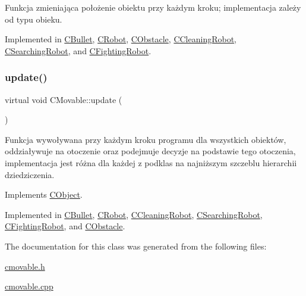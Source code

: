 Funkcja zmieniająca położenie obiektu przy każdym kroku; implementacja zależy od typu obieku. 



Implemented in \mbox{\hyperlink{class_c_bullet_a693e95f219a9a642e3977bb48be0cf5d}{C\+Bullet}}, \mbox{\hyperlink{class_c_robot_a1de9be879213eadf7ded27caedb84598}{C\+Robot}}, \mbox{\hyperlink{class_c_obstacle_a4b2e4989c993dd7f79cd66fd485c3c88}{C\+Obstacle}}, \mbox{\hyperlink{class_c_cleaning_robot_a1ad227a5f3508a8e78fcecae7d3de53b}{C\+Cleaning\+Robot}}, \mbox{\hyperlink{class_c_searching_robot_a2c2150e7fd1cefbb5851e039cd76572f}{C\+Searching\+Robot}}, and \mbox{\hyperlink{class_c_fighting_robot_af644acbba178e256566e9dbd230aa4db}{C\+Fighting\+Robot}}.

\mbox{\label{class_c_movable_af45fc62960d86ef62949d078141e9d62}} 
\subsubsection{\texorpdfstring{update()}{update()}}
{\footnotesize\ttfamily virtual void C\+Movable\+::update (\begin{DoxyParamCaption}{ }\end{DoxyParamCaption})\hspace{0.3cm}{\ttfamily [pure virtual]}}



Funkcja wywoływana przy każdym kroku programu dla wszystkich obiektów, oddziaływuje na otoczenie oraz podejmuje decyzje na podstawie tego otoczenia, implementacja jest różna dla każdej z podklas na najniższym szczeblu hierarchii dziedziczenia. 



Implements \mbox{\hyperlink{class_c_object_acb42ca516e836d0267ddb9a0556916a9}{C\+Object}}.



Implemented in \mbox{\hyperlink{class_c_bullet_a9685917f7fc76d417e03744223b1b2c6}{C\+Bullet}}, \mbox{\hyperlink{class_c_robot_a8ad8d55a840ced20f85a2a045e9e24ef}{C\+Robot}}, \mbox{\hyperlink{class_c_cleaning_robot_afd8b3a58abfc91ebdce32af3686c5e9f}{C\+Cleaning\+Robot}}, \mbox{\hyperlink{class_c_searching_robot_a6e9cdc9eccd32a470d8953f1a3cccd46}{C\+Searching\+Robot}}, \mbox{\hyperlink{class_c_fighting_robot_a3ae0ea383f809766e53c81348a07daaa}{C\+Fighting\+Robot}}, and \mbox{\hyperlink{class_c_obstacle_a9aeb124d28bdef3430954f5e2b5ae0f0}{C\+Obstacle}}.



The documentation for this class was generated from the following files\+:\begin{DoxyCompactItemize}
\item 
\mbox{\hyperlink{cmovable_8h}{cmovable.\+h}}\item 
\mbox{\hyperlink{cmovable_8cpp}{cmovable.\+cpp}}\end{DoxyCompactItemize}
